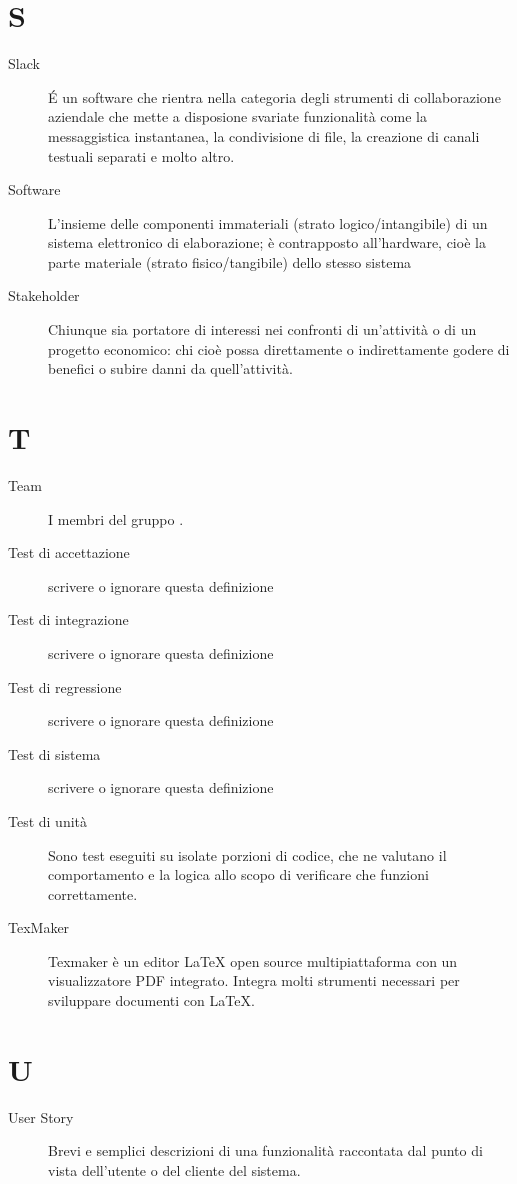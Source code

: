 \documentclass[a4paper, oneside]{article}
\begin{document}
\section{S}
\begin{description}
  \item[Slack] É un software che rientra nella categoria degli strumenti di collaborazione aziendale che mette a disposione svariate funzionalità come la messaggistica instantanea, la condivisione di file, la creazione di canali testuali separati e molto altro.
  \item[Software] L'insieme delle componenti immateriali (strato logico/intangibile) di un sistema elettronico di elaborazione; è contrapposto all'hardware, cioè la parte materiale (strato fisico/tangibile) dello stesso sistema
  \item[Stakeholder] Chiunque sia portatore di interessi nei confronti di un’attività o di un progetto economico: chi cioè possa direttamente o indirettamente godere di benefici o subire danni da quell’attività.
\end{description}
\newpage
\section{T}
\begin{description}
  \item[Team] I membri del gruppo \gruppo{}.
  \item[Test di accettazione] {scrivere o ignorare questa definizione}
  \item[Test di integrazione] {scrivere o ignorare questa definizione}
  \item[Test di regressione] {scrivere o ignorare questa definizione}
  \item[Test di sistema] {scrivere o ignorare questa definizione}
  \item[Test di unità] Sono test eseguiti su isolate porzioni di codice, che ne valutano il comportamento e la logica allo scopo di verificare che funzioni correttamente.
  \item[TexMaker] Texmaker è un editor LaTeX open source multipiattaforma con un visualizzatore PDF integrato. Integra molti strumenti necessari per sviluppare documenti con LaTeX.
\end{description}
\newpage
\section{U}
\begin{description}
  \item[User Story] Brevi e semplici descrizioni di una funzionalità raccontata dal punto di vista dell’utente o del cliente del sistema.
\end{description}
\newpage
\end{document}

